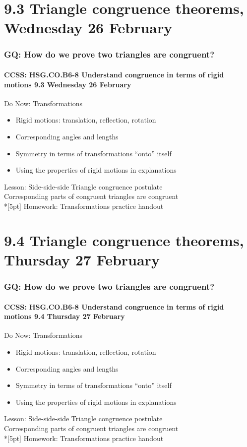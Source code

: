 \documentclass{beamer}
\begin{document}
\section{9.3 Triangle congruence theorems, Wednesday 26 February} 
\frame
{
  \frametitle{GQ: How do we prove two triangles are congruent?}
  \framesubtitle{CCSS: HSG.CO.B6-8 Understand congruence in terms of rigid motions \hfill \alert{9.3 Wednesday 26 February}}

  \begin{block}{Do Now: Transformations}
    \begin{itemize}
      \item Rigid motions: translation, reflection, rotation
      \item Corresponding angles and lengths
      \item Symmetry in terms of transformations ``onto'' itself
      \item Using the properties of rigid motions in explanations
    \end{itemize}
    \end{block}
    Lesson: Side-side-side Triangle congruence postulate \\
    Corresponding parts of congruent triangles are congruent\\*[5pt]
    Homework: Transformations practice handout
}


\section{9.4 Triangle congruence theorems, Thursday 27 February}
\frame
{
  \frametitle{GQ: How do we prove two triangles are congruent?}
  \framesubtitle{CCSS: HSG.CO.B6-8 Understand congruence in terms of rigid motions \hfill \alert{9.4 Thursday 27 February}}

  \begin{block}{Do Now: Transformations}
    \begin{itemize}
      \item Rigid motions: translation, reflection, rotation
      \item Corresponding angles and lengths
      \item Symmetry in terms of transformations ``onto'' itself
      \item Using the properties of rigid motions in explanations
    \end{itemize}
    \end{block}
    Lesson: Side-side-side Triangle congruence postulate \\
    Corresponding parts of congruent triangles are congruent\\*[5pt]
    Homework: Transformations practice handout
}
\end{document}
